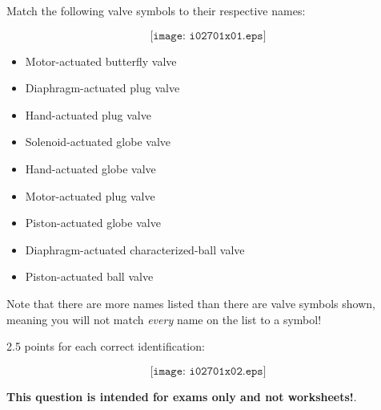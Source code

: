 

Match the following valve symbols to their respective names:

$$\texttt{[image: i02701x01.eps]}$$

\begin{itemize}
\item{} Motor-actuated butterfly valve
\item{} Diaphragm-actuated plug valve
\item{} Hand-actuated plug valve
\item{} Solenoid-actuated globe valve
\item{} Hand-actuated globe valve
\item{} Motor-actuated plug valve
\item{} Piston-actuated globe valve
\item{} Diaphragm-actuated characterized-ball valve
\item{} Piston-actuated ball valve
\end{itemize}

Note that there are more names listed than there are valve symbols shown, meaning you will not match {\it every} name on the list to a symbol!







2.5 points for each correct identification:

$$\texttt{[image: i02701x02.eps]}$$







{\bf This question is intended for exams only and not worksheets!}.



